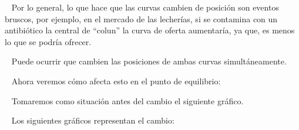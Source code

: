 \documentclass[
  letterpaper,
  DIV=11,
  numbers=noendperiod]{scrreport}
\begin{document}
~ Por lo general, lo que hace que las curvas cambien de posición son
eventos bruscos, por ejemplo, en el mercado de las lecherías, si se
contamina con un antibiótico la central de ``colun'' la curva de oferta
aumentaría, ya que, es menos lo que se podría ofrecer.

~ Puede ocurrir que cambien las posiciones de ambas curvas
simultáneamente.

~ Ahora veremos cómo afecta esto en el punto de equilibrio:

~ Tomaremos como situación antes del cambio el siguiente gráfico.

\begin{center}
\end{center}

~ Los siguientes gráficos representan el cambio:
\end{document}
